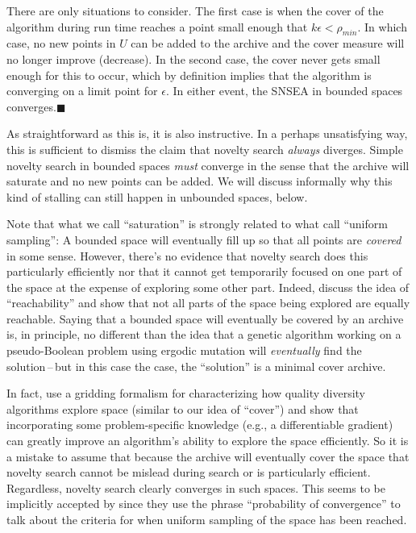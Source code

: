 \documentclass[twoside]{article}
\begin{document}
There are only situations to consider.  The first case is when the cover of the algorithm during run time reaches a point small enough that $k\epsilon < \rho_{min}$.  In which case, no new points in $U$ can be added to the archive and the cover measure will no longer improve (decrease).  In the second case, the cover never gets small enough for this to occur, which by definition implies that the algorithm is converging on a limit point for $\epsilon$.  In either event, the SNSEA in bounded spaces converges.$\blacksquare$

\vspace*{1ex}

As straightforward as this is, it is also instructive.  In a perhaps unsatisfying way, this is sufficient to dismiss the claim that novelty search \emph{always} diverges.  Simple novelty search in bounded spaces \emph{must} converge in the sense that the archive will saturate and no new points can be added.  We will discuss informally why this kind of stalling can still happen in unbounded spaces, below.

Note that what we call ``saturation'' is strongly related to what \citet{Doncieux2019gecco} call ``uniform sampling'':  A bounded space will eventually fill up so that all points are \emph{covered} in some sense.  However, there's no evidence that novelty search does this particularly efficiently nor that it cannot get temporarily focused on one part of the space at the expense of exploring some other part. Indeed, \citet{Doncieux2019gecco} discuss the idea of ``reachability'' and show that not all parts of the space being explored are equally reachable.  Saying that a bounded space will eventually be covered by an archive is, in principle, no different than the idea that a genetic algorithm working on a pseudo-Boolean problem using ergodic mutation will \emph{eventually} find the solution\,--\,but in this case the case, the ``solution'' is a minimal cover archive.

In fact, \citet{Fontaine2021corr} use a gridding formalism for characterizing how quality diversity algorithms explore space (similar to our idea of ``cover'') and show that incorporating some problem-specific knowledge (e.g., a differentiable gradient) can greatly improve an algorithm's ability to explore the space efficiently.  So it is a mistake to assume that because the archive will eventually cover the space that novelty search cannot be mislead during search or is particularly efficient.  Regardless, novelty search clearly converges in such spaces.  This seems to be implicitly accepted by \citet{Doncieux2019gecco} since they use the phrase ``probability of convergence'' to talk about the criteria for when uniform sampling of the space has been reached.
\end{document}
